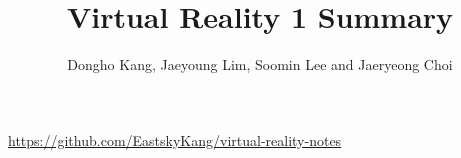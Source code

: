 \documentclass[12pt]{article}
\title{Virtual Reality 1 Summary}
\author{Dongho Kang, Jaeyoung Lim, Soomin Lee and Jaeryeong Choi}
\begin{document}
 

\maketitle

\url{https://github.com/EastskyKang/virtual-reality-notes}

%
%

%
\end{document}
